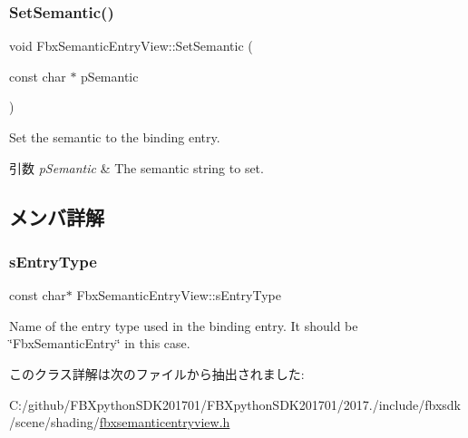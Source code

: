 \subsubsection{\texorpdfstring{Set\+Semantic()}{SetSemantic()}}
{\footnotesize\ttfamily void Fbx\+Semantic\+Entry\+View\+::\+Set\+Semantic (\begin{DoxyParamCaption}\item[{const char $\ast$}]{p\+Semantic }\end{DoxyParamCaption})}

Set the semantic to the binding entry. 
\begin{DoxyParams}{引数}
{\em p\+Semantic} & The semantic string to set. \\
\hline
\end{DoxyParams}


\subsection{メンバ詳解}
\mbox{\label{class_fbx_semantic_entry_view_a971315cc135c67cb4ca164a69fe6f6b2}} 
\subsubsection{\texorpdfstring{s\+Entry\+Type}{sEntryType}}
{\footnotesize\ttfamily const char$\ast$ Fbx\+Semantic\+Entry\+View\+::s\+Entry\+Type\hspace{0.3cm}{\ttfamily [static]}}

Name of the entry type used in the binding entry. It should be \char`\"{}\+Fbx\+Semantic\+Entry\char`\"{} in this case. 

このクラス詳解は次のファイルから抽出されました\+:\begin{DoxyCompactItemize}
\item 
C\+:/github/\+F\+B\+Xpython\+S\+D\+K201701/\+F\+B\+Xpython\+S\+D\+K201701/2017./include/fbxsdk/scene/shading/\hyperlink{fbxsemanticentryview_8h}{fbxsemanticentryview.\+h}\end{DoxyCompactItemize}
